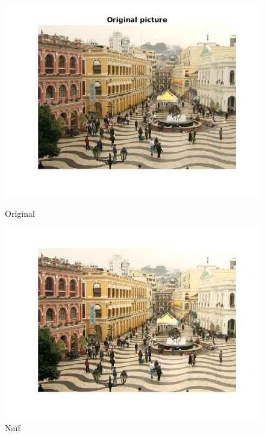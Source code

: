 \documentclass{article}
\begin{document}
\begin{figure}[h]
\centering
\begin{minipage}{0.33\textwidth}
\centering
\includegraphics[width=1\textwidth]{images/macau_conc_depart.jpg}
\caption{Original}
\end{minipage}%
\begin{minipage}{0.33\textwidth}
\centering
\includegraphics[width=1\textwidth]{images/macau_conc_inter.jpg}
\caption{Naïf}
\end{minipage}%
\begin{minipage}{0.33\textwidth}
\centering

\end{minipage}
\end{figure}
\end{document}

